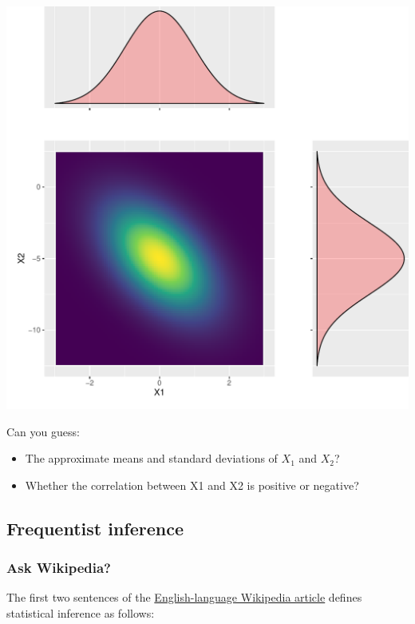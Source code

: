 \documentclass[
  11pt,
]{article}
\providecommand{\tightlist}{%
  \setlength{\itemsep}{0pt}\setlength{\parskip}{0pt}}
\begin{document}
\begin{center}\includegraphics{01-01-lec_files/figure-latex/bvnnorm-3-1} \end{center}

Can you guess:

\begin{itemize}
\tightlist
\item
  The approximate means and standard deviations of \(X_1\) and \(X_2\)?
\item
  Whether the correlation between X1 and X2 is positive or negative?
\end{itemize}

\hypertarget{frequentist-inference}{%
\subsection{Frequentist inference}\label{frequentist-inference}}

\hypertarget{ask-wikipedia}{%
\subsubsection{Ask Wikipedia?}\label{ask-wikipedia}}

The first two sentences of the \href{https://en.wikipedia.org/wiki/Statistical_inference}{English-language Wikipedia article} defines statistical inference as follows:
\end{document}
